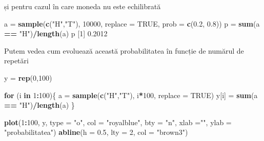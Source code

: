 \documentclass[]{article}
\newenvironment{Shaded}{\begin{snugshade}}{\end{snugshade}}
\newcommand{\KeywordTok}[1]{\textcolor[rgb]{0.13,0.29,0.53}{\textbf{#1}}}
\newcommand{\DataTypeTok}[1]{\textcolor[rgb]{0.13,0.29,0.53}{#1}}
\newcommand{\DecValTok}[1]{\textcolor[rgb]{0.00,0.00,0.81}{#1}}
\newcommand{\FloatTok}[1]{\textcolor[rgb]{0.00,0.00,0.81}{#1}}
\newcommand{\StringTok}[1]{\textcolor[rgb]{0.31,0.60,0.02}{#1}}
\newcommand{\OtherTok}[1]{\textcolor[rgb]{0.56,0.35,0.01}{#1}}
\newcommand{\ControlFlowTok}[1]{\textcolor[rgb]{0.13,0.29,0.53}{\textbf{#1}}}
\newcommand{\OperatorTok}[1]{\textcolor[rgb]{0.81,0.36,0.00}{\textbf{#1}}}
\newcommand{\NormalTok}[1]{#1}
\begin{document}
și pentru cazul în care moneda nu este echilibrată

\begin{Shaded}
\begin{Highlighting}[]
\NormalTok{a =}\StringTok{ }\KeywordTok{sample}\NormalTok{(}\KeywordTok{c}\NormalTok{(}\StringTok{"H"}\NormalTok{,}\StringTok{"T"}\NormalTok{), }\DecValTok{10000}\NormalTok{, }\DataTypeTok{replace =} \OtherTok{TRUE}\NormalTok{, }\DataTypeTok{prob =} \KeywordTok{c}\NormalTok{(}\FloatTok{0.2}\NormalTok{, }\FloatTok{0.8}\NormalTok{))}
\NormalTok{p =}\StringTok{ }\KeywordTok{sum}\NormalTok{(a }\OperatorTok{==}\StringTok{ "H"}\NormalTok{)}\OperatorTok{/}\KeywordTok{length}\NormalTok{(a)}
\NormalTok{p}
\NormalTok{[}\DecValTok{1}\NormalTok{] }\FloatTok{0.2012}
\end{Highlighting}
\end{Shaded}

Putem vedea cum evoluează această probabilitatea în funcție de numărul
de repetări

\begin{Shaded}
\begin{Highlighting}[]
\NormalTok{y =}\StringTok{ }\KeywordTok{rep}\NormalTok{(}\DecValTok{0}\NormalTok{,}\DecValTok{100}\NormalTok{)}

\ControlFlowTok{for}\NormalTok{ (i }\ControlFlowTok{in} \DecValTok{1}\OperatorTok{:}\DecValTok{100}\NormalTok{)\{}
\NormalTok{  a =}\StringTok{ }\KeywordTok{sample}\NormalTok{(}\KeywordTok{c}\NormalTok{(}\StringTok{"H"}\NormalTok{,}\StringTok{"T"}\NormalTok{), i}\OperatorTok{*}\DecValTok{100}\NormalTok{, }\DataTypeTok{replace =} \OtherTok{TRUE}\NormalTok{)}
\NormalTok{  y[i] =}\StringTok{ }\KeywordTok{sum}\NormalTok{(a }\OperatorTok{==}\StringTok{ "H"}\NormalTok{)}\OperatorTok{/}\KeywordTok{length}\NormalTok{(a)}
\NormalTok{\}}

\KeywordTok{plot}\NormalTok{(}\DecValTok{1}\OperatorTok{:}\DecValTok{100}\NormalTok{, y, }\DataTypeTok{type =} \StringTok{"o"}\NormalTok{, }\DataTypeTok{col =} \StringTok{"royalblue"}\NormalTok{, }\DataTypeTok{bty =} \StringTok{"n"}\NormalTok{,}
     \DataTypeTok{xlab =}\StringTok{""}\NormalTok{, }\DataTypeTok{ylab =} \StringTok{"probabilitatea"}\NormalTok{)}
\KeywordTok{abline}\NormalTok{(}\DataTypeTok{h =} \FloatTok{0.5}\NormalTok{, }\DataTypeTok{lty =} \DecValTok{2}\NormalTok{, }\DataTypeTok{col =} \StringTok{"brown3"}\NormalTok{)}
\end{Highlighting}
\end{Shaded}
\end{document}
